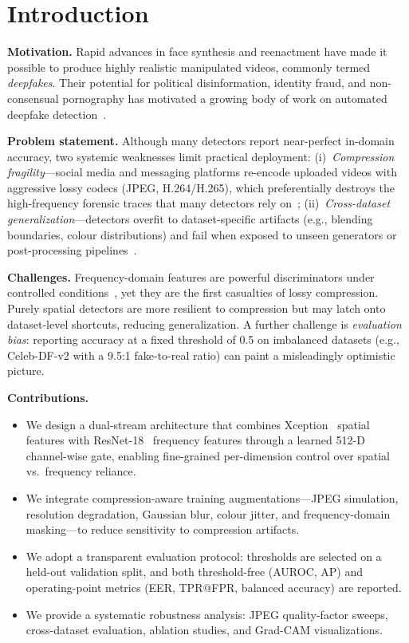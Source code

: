 \documentclass[conference]{IEEEtran}
\begin{document}
\section{Introduction}

\textbf{Motivation.}
Rapid advances in face synthesis and reenactment have made it possible to produce highly realistic manipulated videos, commonly termed \emph{deepfakes}.
Their potential for political disinformation, identity fraud, and non-consensual pornography has motivated a growing body of work on automated deepfake detection~\cite{rossler2019faceforensics,li2020celebdf}.

\textbf{Problem statement.}
Although many detectors report near-perfect in-domain accuracy, two systemic weaknesses limit practical deployment:
(i)~\emph{Compression fragility}---social media and messaging platforms re-encode uploaded videos with aggressive lossy codecs (JPEG, H.264/H.265), which preferentially destroys the high-frequency forensic traces that many detectors rely on~\cite{frank2020leveraging};
(ii)~\emph{Cross-dataset generalization}---detectors overfit to dataset-specific artifacts (e.g., blending boundaries, colour distributions) and fail when exposed to unseen generators or post-processing pipelines~\cite{li2020facexray,yan2023ucf,wang2024wilddeepfake}.

\textbf{Challenges.}
Frequency-domain features are powerful discriminators under controlled conditions~\cite{qian2020f3net,durall2020watch}, yet they are the first casualties of lossy compression.
Purely spatial detectors are more resilient to compression but may latch onto dataset-level shortcuts, reducing generalization.
A further challenge is \emph{evaluation bias}: reporting accuracy at a fixed threshold of 0.5 on imbalanced datasets (e.g., Celeb-DF-v2 with a 9.5:1 fake-to-real ratio) can paint a misleadingly optimistic picture.

\textbf{Contributions.}
\begin{itemize}
  \item We design a dual-stream architecture that combines Xception~\cite{chollet2017xception} spatial features with ResNet-18~\cite{he2016resnet} frequency features through a learned 512-D channel-wise gate, enabling fine-grained per-dimension control over spatial vs.\ frequency reliance.
  \item We integrate compression-aware training augmentations---JPEG simulation, resolution degradation, Gaussian blur, colour jitter, and frequency-domain masking---to reduce sensitivity to compression artifacts.
  \item We adopt a transparent evaluation protocol: thresholds are selected on a held-out validation split, and both threshold-free (AUROC, AP) and operating-point metrics (EER, TPR@FPR, balanced accuracy) are reported.
  \item We provide a systematic robustness analysis: JPEG quality-factor sweeps, cross-dataset evaluation, ablation studies, and Grad-CAM visualizations.
\end{itemize}
\end{document}
